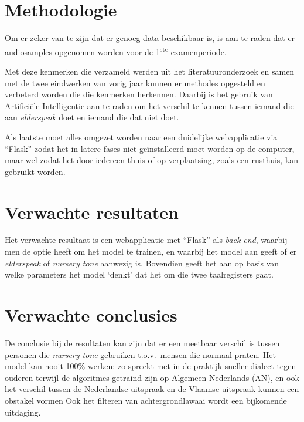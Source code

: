 \section{Methodologie}
\label{sec:methodologie}

Om er zeker van te zijn dat er genoeg data beschikbaar is, is aan te raden dat er audiosamples opgenomen worden voor de 1\textsuperscript{ste} examenperiode.

Met deze kenmerken die verzameld werden uit het literatuuronderzoek en samen met de twee eindwerken van vorig jaar kunnen er methodes opgesteld en verbeterd worden die die kenmerken herkennen.
Daarbij is het gebruik van Artificiële Intelligentie aan te raden om het verschil te kennen tussen iemand die aan \textit{elderspeak} doet en iemand die dat niet doet.

Als laatste moet alles omgezet worden naar een duidelijke webapplicatie via ``Flask'' zodat het in latere fases niet geïnstalleerd moet worden op de computer, maar wel zodat het door iedereen thuis of op verplaatsing, zoals een rusthuis, kan gebruikt worden.


\section{Verwachte resultaten}
\label{sec:verwachte_resultaten}

Het verwachte resultaat is een webapplicatie met ``Flask'' als \textit{back-end}, waarbij men de optie heeft om het model te trainen, en waarbij het model aan geeft of er \textit{elderspeak} of \textit{nursery tone} aanwezig is. Bovendien geeft het aan op basis van welke parameters het model `denkt' dat het om die twee taalregisters gaat.


\section{Verwachte conclusies}
\label{sec:verwachte_conclusies}

De conclusie bij de resultaten kan zijn dat er een meetbaar verschil is tussen personen die \textit{nursery tone} gebruiken t.o.v.\ mensen die normaal praten.
Het model kan nooit 100\% werken: zo spreekt met in de praktijk sneller dialect tegen ouderen terwijl de algoritmes getraind zijn op Algemeen Nederlands (AN), en ook het verschil tussen de Nederlandse uitspraak en de Vlaamse uitspraak kunnen een obstakel vormen
Ook het filteren van achtergrondlawaai wordt een bijkomende uitdaging.

